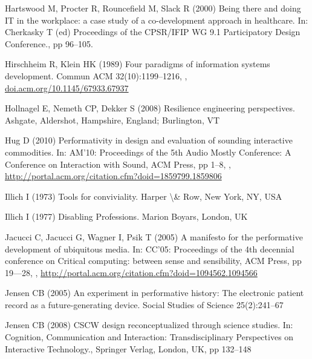 \documentclass{article}
\begin{document}
\begin{thebibliography}{193}
Hartswood M, Procter R, Rouncefield M, Slack R (2000) Being there and doing
  {IT} in the workplace: a case study of a co-development approach in
  healthcare. In: Cherkasky T (ed) Proceedings of the {CPSR/IFIP} {WG} 9.1
  Participatory Design Conference., pp 96--105.

Hirschheim R, Klein HK (1989) Four paradigms of information systems
  development. Commun {ACM} 32(10):1199--1216, ,
  \urlprefix\url{doi.acm.org/10.1145/67933.67937}

Hollnagel E, Nemeth CP, Dekker S (2008) Resilience engineering perspectives.
  Ashgate, Aldershot, Hampshire, England; Burlington, {VT}

Hug D (2010) Performativity in design and evaluation of sounding interactive
  commodities. In: {AM'10:} Proceedings of the 5th Audio Mostly Conference: A
  Conference on Interaction with Sound, {ACM} Press, pp 1--8,
  ,
  \urlprefix\url{http://portal.acm.org/citation.cfm?doid=1859799.1859806}

Illich I (1973) Tools for conviviality. Harper {\textbackslash}\& Row, New
  York, {NY}, {USA}

Illich I (1977) Disabling Professions. Marion Boyars, London, {UK}

Jacucci C, Jacucci G, Wagner I, Psik T (2005) A manifesto for the performative
  development of ubiquitous media. In: {CC'05:} Proceedings of the 4th
  decennial conference on Critical computing: between sense and sensibility,
  {ACM} Press, pp 19---28, ,
  \urlprefix\url{http://portal.acm.org/citation.cfm?doid=1094562.1094566}

Jensen CB (2005) An experiment in performative history: The electronic patient
  record as a future-generating device. Social Studies of Science 25(2):241--67

Jensen CB (2008) {CSCW} design reconceptualized through science studies. In:
  Cognition, Communication and Interaction: Transdisciplinary Perspectives on
  Interactive Technology., Springer Verlag, London, {UK}, pp 132--148


\end{thebibliography}
\end{document}

